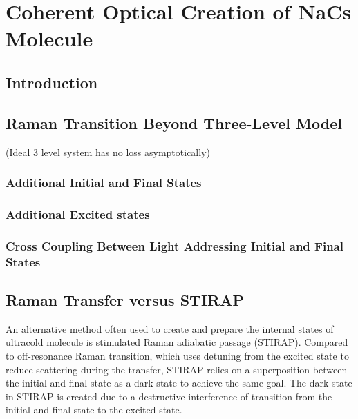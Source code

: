 
\chapter{Coherent Optical Creation of NaCs Molecule}
\label{ch:raman-transfer}

\section{Introduction}

\section{Raman Transition Beyond Three-Level Model}

(Ideal 3 level system has no loss asymptotically)


\subsection{Additional Initial and Final States}

\subsection{Additional Excited states}

\subsection{Cross Coupling Between Light Addressing Initial and Final States}

\section{Raman Transfer versus STIRAP}

An alternative method often used to create and prepare the internal states of ultracold molecule
is stimulated Raman adiabatic passage (STIRAP)\todo{\cite{}}.
Compared to off-resonance Raman transition, which uses detuning from the excited state
to reduce scattering during the transfer, STIRAP relies on a superposition between
the initial and final state as a dark state to achieve the same goal.
The dark state in STIRAP is created due to a destructive interference of transition
from the initial and final state to the excited state.

